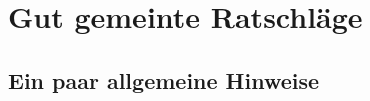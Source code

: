 \chapter{Gut gemeinte Ratschläge}
\label{chapter:auxiliary}

\section{Ein paar allgemeine Hinweise}

